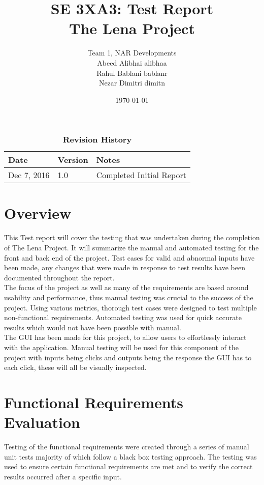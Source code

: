 \documentclass[12pt, titlepage]{article}
\title{SE 3XA3: Test Report\\The Lena Project}
\author{Team 1, NAR Developments
		\\ Abeed Alibhai alibhaa
		\\ Rahul Bablani bablanr
		\\ Nezar Dimitri dimitn
}
\date{\today}
\begin{document}
\maketitle
{}
\tableofcontents
\listoftables
\listoffigures
\begin{table}[bp]
\caption{\bf Revision History}
\begin{tabularx}{\textwidth}{p{3cm}p{2cm}X}
\toprule {\bf Date} & {\bf Version} & {\bf Notes}\\
\midrule
Dec 7, 2016 & 1.0 & Completed Initial Report\\
\bottomrule
\end{tabularx}
\end{table}
\newpage
{}
\section{Overview}

This Test report will cover the testing that was undertaken during the completion of The Lena Project. It will summarize the manual and automated testing for the front and back end of the project. Test cases for valid and abnormal inputs have been made, any changes that were made in response to test results have been documented throughout the report.\\

The focus of the project as well as many of the requirements are based around usability and performance, thus manual testing was crucial to the success of the project. Using various metrics, thorough test cases were designed to test multiple non-functional requirements. Automated testing was used for quick accurate results which would not have been possible with manual.\\
		
The GUI has been made for this project, to allow users to effortlessly interact with the application. Manual testing will be used for this component of the project with inputs being clicks and outputs being the response the GUI has to each click, these will all be visually inspected.

\section{Functional Requirements Evaluation}
Testing of the functional requirements were created through a series of manual unit tests majority of which follow a black box testing approach. The testing was used to ensure certain functional requirements are met and to verify the correct results occurred after a specific input.
\end{document}
